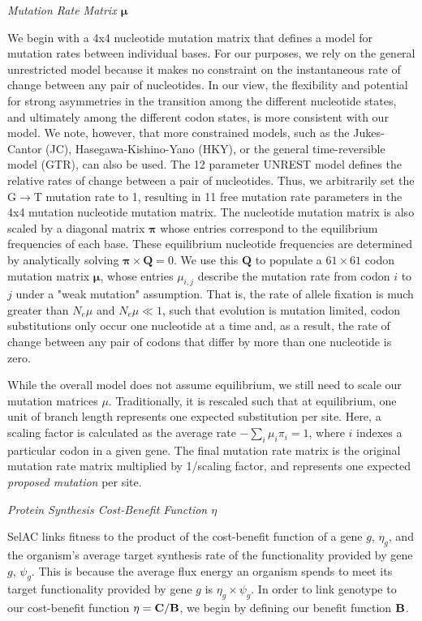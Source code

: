 \documentclass[12pt,letterpaper]{article}
\renewcommand{\subsection}[1]{%
\bigskip
\begin{center}
\begin{large}
\normalfont\itshape #1
\end{large}
\end{center}}
\newcommand{\Cost}{\ensuremath{\text{\textbf{C}}}\xspace}
\newcommand{\Func}{\ensuremath{\text{\textbf{B}}}\xspace}
\newcommand{\Nemu}{\ensuremath{{N_e \mu}}\xspace} %
\newcommand{\pimatrix}{\ensuremath{\mathbf{\pi}}\xspace}
\newcommand{\mumatrix}{\ensuremath{\mathbf{\mu}}\xspace}
\newcommand{\Qmatrix}{\ensuremath{\mathbf{Q}}\xspace}
\newcommand{\selac}{SelAC\xspace}
\newcommand{\etag}{\ensuremath{\eta_g}\xspace}
\newcommand{\muij}{\ensuremath{\mu_{i,j}}\xspace}
\newcommand{\psig}{\ensuremath{\psi_{g}}\xspace}
\begin{document}
\subsection{Mutation Rate Matrix \mumatrix}
We begin with a 4x4 nucleotide mutation matrix that defines a model for mutation rates between individual bases.
For our purposes, we rely on the general unrestricted model\citep[UNREST]{Yang1994} because it makes no constraint on the instantaneous rate of change between any pair of nucleotides.
In our view, the flexibility and potential for strong asymmetries in the transition among the different nucleotide states, and ultimately among the different codon states, is more consistent with our model.
We note, however, that more constrained models, such as the Jukes-Cantor (JC), Hasegawa-Kishino-Yano (HKY), or the general time-reversible model (GTR), can also be used.
The 12 parameter UNREST model defines the relative rates of change between a pair of nucleotides.
Thus, we arbitrarily set the G$\rightarrow$T mutation rate to 1, resulting in 11 free mutation rate parameters in the 4x4 mutation nucleotide mutation matrix.
The nucleotide mutation matrix is also scaled by a diagonal matrix \pimatrix whose entries correspond to the equilibrium frequencies of each base.
These equilibrium nucleotide frequencies are determined by analytically solving $\pimatrix \times \Qmatrix = 0$.
We use this \Qmatrix to populate a $61 \times 61$ codon mutation matrix $\mumatrix$, whose entries $\muij$ describe the mutation rate from codon $i$ to $j$ under a "weak mutation" assumption.
That is, the rate of allele fixation is much greater than \Nemu and $\Nemu \ll 1$, such that evolution is mutation limited, codon substitutions only occur one nucleotide at a time and, as a result, the rate of change between any pair of codons that differ by more than one nucleotide is zero.

While the overall model does not assume equilibrium, we still need to scale our mutation matrices $\mu$.
Traditionally, it is rescaled such that at equilibrium, one unit of branch length represents one expected substitution per site.
Here, a scaling factor is calculated as the average rate $-\sum_i \mu_i \pi_i=1$, where $i$ indexes a particular codon in a given gene.
The final mutation rate matrix is the original mutation rate matrix multiplied by 1/scaling factor, and represents one expected \emph{proposed mutation} per site.

\subsection{Protein Synthesis Cost-Benefit Function $\eta$}
\selac links fitness to the product of the cost-benefit function of a gene $g$, $\etag$, and the organism's average target synthesis rate of the functionality provided by gene $g$, $\psig$.
This is because the average flux energy an organism spends to meet its target functionality provided by gene $g$ is $\etag \times \psig$.
In order to link genotype to our cost-benefit function $\eta = \Cost/\Func$, we begin by defining our benefit function \Func.
\end{document}
